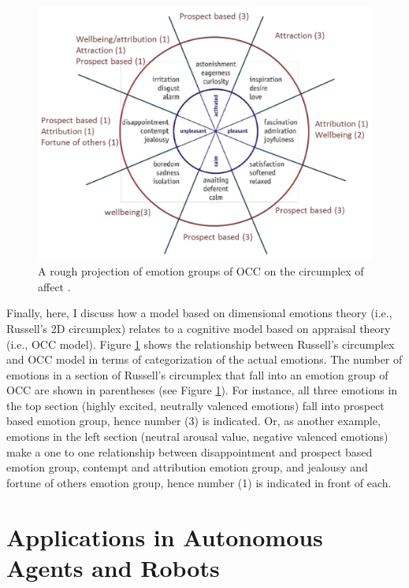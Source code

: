 \documentclass[11pt]{article}
\begin{document}
\begin{figure}[tbh]
  \center
  \includegraphics[width=.9\textwidth]{figure/occ-circumplex-mapping.png}
  \caption{A rough projection of emotion groups of OCC on the circumplex of
  affect \cite{ahmadpour:occ-dimensional-comparison}.}
  \label{fig:occ-circumplex}
\end{figure}

Finally, here, I discuss how a model based on dimensional emotions theory
(i.e., Russell's 2D circumplex) relates to a cognitive model based on appraisal
theory (i.e., OCC model). Figure \ref{fig:occ-circumplex} shows the relationship
between Russell's circumplex and OCC model in terms of categorization of the
actual emotions. The number of emotions in a section of Russell's circumplex
that fall into an emotion group of OCC are shown in parentheses (see Figure
\ref{fig:occ-circumplex}). For instance, all three emotions in the top section
(highly excited, neutrally valenced emotions) fall into prospect based emotion
group, hence number (3) is indicated. Or, as another example, emotions in the
left section (neutral arousal value, negative valenced emotions) make a one to
one relationship between disappointment and prospect based emotion group,
contempt and attribution emotion group, and jealousy and fortune of others
emotion group, hence number (1) is indicated in front of each.

\section{Applications in Autonomous Agents and Robots}
\label{sec:applications}
\end{document}
